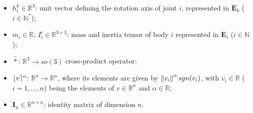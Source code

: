 \begin{itemize}
%
%
\item $h^{k}_{i} \in \mathbb{R}^{3}$: unit vector defining the rotation axis of joint $i$, represented in $\mathbf{E}_k$ ($i \in \mathbb{N}^*$);
%

\item $m_i \in \mathbb{R} ,\, I^{i}_{i} \in \mathbb{R}^{3 \times 3}$: mass and inertia tensor of body $i$ represented in $\mathbf{E}_{i}$ ($i \in \mathbb{N}$);
%
\item $\widehat{*}$: $\mathbb{R}^3 \rightarrow so(3)$ cross-product operator;
%
\item $\lfloor v \rceil^{\alpha}$: $\mathbb{R}^n \rightarrow \mathbb{R}^n$, where its elements are given by $\left\lVert v_i\right\rVert^{\alpha}sgn(v_i)$, with $v_i \in \mathbb{R}$ ($i = 1,...,n$) being the elements of $v \in \mathbb{R}^n$ and $\alpha \in \mathbb{R}$;
%
\item $\mathbf{I}_{n} \in \mathbb{R}^{n \times n}$: identity matrix of dimension $n$.
%
\end{itemize}
%
%
%
